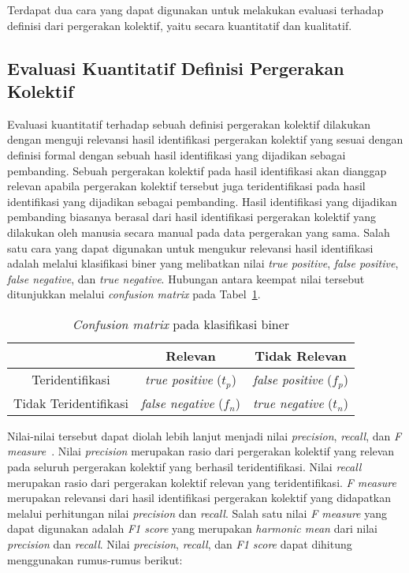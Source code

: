 Terdapat dua cara yang dapat digunakan untuk melakukan evaluasi terhadap definisi dari pergerakan kolektif, yaitu secara kuantitatif dan kualitatif.

\subsection{Evaluasi Kuantitatif Definisi Pergerakan Kolektif}
\label{subsec:quantitative-theory}

Evaluasi kuantitatif terhadap sebuah definisi pergerakan kolektif dilakukan dengan menguji relevansi hasil identifikasi pergerakan kolektif yang sesuai dengan definisi formal dengan sebuah hasil identifikasi yang dijadikan sebagai pembanding. Sebuah pergerakan kolektif pada hasil identifikasi akan dianggap relevan apabila pergerakan kolektif tersebut juga teridentifikasi pada hasil identifikasi yang dijadikan sebagai pembanding. Hasil identifikasi yang dijadikan pembanding biasanya berasal dari hasil identifikasi pergerakan kolektif yang dilakukan oleh manusia  secara manual pada data pergerakan yang sama. Salah satu cara yang dapat digunakan untuk mengukur relevansi hasil identifikasi adalah melalui klasifikasi biner yang melibatkan nilai \textit{true positive}, \textit{false positive}, \textit{false negative}, dan \textit{true negative}. Hubungan antara keempat nilai tersebut ditunjukkan melalui \textit{confusion matrix} pada Tabel~\ref{bab2:confusion}.

\begin{table}[h]
    \centering
    \caption{\textit{Confusion matrix} pada klasifikasi biner}
    \begin{tabular}{|c|c|c|}
        \hline
         & Relevan & Tidak Relevan  \\ \hline
        Teridentifikasi & \textit{true positive} ($t_p$) & \textit{false positive} ($f_p$) \\ \hline
        Tidak Teridentifikasi & \textit{false negative} ($f_n$) & \textit{true negative} ($t_n$) \\
        \hline
    \end{tabular}
    \label{bab2:confusion}
\end{table}

Nilai-nilai tersebut dapat diolah lebih lanjut menjadi nilai \textit{precision}, \textit{recall}, dan \textit{F measure}~\cite{manning:02:ir}. Nilai \textit{precision} merupakan rasio dari pergerakan kolektif yang relevan pada seluruh pergerakan kolektif yang berhasil teridentifikasi. Nilai \textit{recall} merupakan rasio dari pergerakan kolektif relevan yang teridentifikasi. \textit{F measure} merupakan relevansi dari hasil identifikasi pergerakan kolektif yang didapatkan melalui perhitungan nilai \textit{precision} dan \textit{recall}. Salah satu nilai \textit{F measure} yang dapat digunakan adalah \textit{F1 score} yang merupakan \textit{harmonic mean} dari nilai \textit{precision} dan \textit{recall}. Nilai \textit{precision}, \textit{recall}, dan \textit{F1 score} dapat dihitung menggunakan rumus-rumus berikut:


